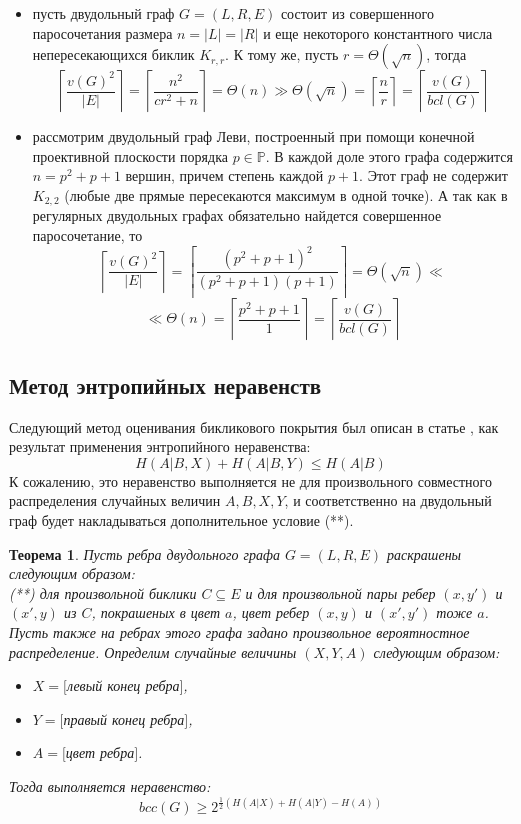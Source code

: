 \documentclass[a4paper]{article}
\newtheorem{mtheorem}{Теорема}[section]
\begin{document}
\begin{itemize}
    \item пусть двудольный граф $G = (L, R, E)$ состоит из совершенного паросочетания размера 
    $n = |L| = |R|$ и еще некоторого константного числа непересекающихся биклик $K_{r,r}$. 
    К тому же, пусть $r = \Theta(\sqrt{n})$, тогда $$\left\lceil\frac{v(G)^2}{|E|}\right\rceil = 
    \left\lceil\frac{n^2}{cr^2 + n}\right\rceil = \Theta(n) \gg \Theta(\sqrt{n}) = \left\lceil\frac{n}{r}\right\rceil = 
    \left\lceil\frac{v(G)}{bcl(G)}\right\rceil$$ 
    \item рассмотрим двудольный граф Леви, построенный при помощи конечной проективной плоскости порядка 
    $p\in \mathbb{P}$. В каждой доле этого графа содержится $n = p^2 + p + 1$ вершин, причем степень 
    каждой $p+1$. Этот граф не содержит $K_{2,2}$ (любые две прямые пересекаются максимум в одной точке). 
    А так как в регулярных двудольных графах обязательно найдется совершенное паросочетание, то 
    $$\left\lceil\frac{v(G)^2}{|E|}\right\rceil = \left\lceil\frac{(p^2 + p + 1)^2}{(p^2+p+1)(p+1)}\right\rceil = 
    \Theta(\sqrt{n}) \ll$$ $$\ll \Theta(n) = \left\lceil\frac{p^2 + p + 1}{1}\right\rceil = \left\lceil\frac{v(G)}{bcl(G)}\right\rceil$$
\end{itemize}




\subsection{Метод энтропийных неравенств}

Следующий метод оценивания бикликового покрытия был описан в статье \cite{EntropyInequality}, как результат 
применения энтропийного неравенства: $$H(A|B,X) + H(A|B,Y) \leq H(A|B)$$ К сожалению, это неравенство 
выполняется не для произвольного совместного распределения случайных величин $A, B, X, Y$, и соответственно 
на двудольный граф будет накладываться дополнительное условие (**).

\begin{mtheorem}
    Пусть ребра двудольного графа $G = (L, R, E)$ раскрашены следующим образом:\ \\
    (**) для произвольной биклики $C\subseteq E$ и для произвольной пары ребер $(x, y')$ и $(x', y)$ 
    из $C$, покрашеных в цвет $a$, цвет ребер $(x, y)$ и $(x', y')$ тоже $a$.\ \\
    Пусть также на ребрах этого графа задано произвольное вероятностное распределение. Определим случайные 
    величины $(X, Y, A)$ следующим образом:
    \begin{itemize}[noitemsep]
        \item $X = [$левый конец ребра$]$, 
        \item $Y = [$правый конец ребра$]$,
        \item $A = [$цвет ребра$]$.
    \end{itemize}
    Тогда выполняется неравенство: $$bcc(G) \geq 2^{\frac{1}{2}(H(A|X) + H(A|Y) - H(A))}$$
\end{mtheorem}
\end{document}
